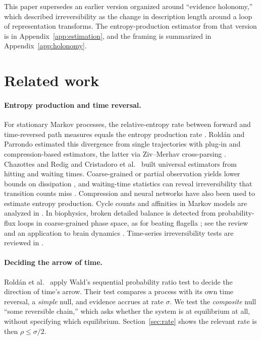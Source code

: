 \documentclass[11pt]{article}
\theoremstyle{definition}
\theoremstyle{remark}
\begin{document}
This paper supersedes an earlier version organized around ``evidence holonomy,'' which described irreversibility as the change in description length around a loop of representation transforms. The entropy-production estimator from that version is in Appendix~\ref{app:estimation}, and the framing is summarized in Appendix~\ref{app:holonomy}.

\section{Related work}\label{sec:related}

\paragraph{Entropy production and time reversal.} For stationary Markov processes, the relative-entropy rate between forward and time-reversed path measures equals the entropy production rate \cite{schnakenberg1976,gaspard2004,seifert2012}. Roldán and Parrondo estimated this divergence from single trajectories with plug-in and compression-based estimators, the latter via Ziv--Merhav cross-parsing \cite{roldanparrondo2010,roldanparrondo2012,zivmerhav1993}. Chazottes and Redig \cite{chazottesredig2005} and Cristadoro et al.\ \cite{cristadoro2023} built universal estimators from hitting and waiting times. Coarse-grained or partial observation yields lower bounds on dissipation \cite{gomezmarin2008}, and waiting-time statistics can reveal irreversibility that transition counts miss \cite{martinez2019}. Compression \cite{martiniani2019,ro2022} and neural networks \cite{kim2020} have also been used to estimate entropy production. Cycle counts and affinities in Markov models are analyzed in \cite{pietzonka2021}. In biophysics, broken detailed balance is detected from probability-flux loops in coarse-grained phase space, as for beating flagella \cite{battle2016}; see the review \cite{gnesotto2018} and an application to brain dynamics \cite{lynn2021}. Time-series irreversibility tests are reviewed in \cite{zaninpapo2021}.

\paragraph{Deciding the arrow of time.} Roldán et al.\ \cite{roldan2015} apply Wald's sequential probability ratio test to decide the direction of time's arrow. Their test compares a process with its own time reversal, a \emph{simple} null, and evidence accrues at rate $\sigma$. We test the \emph{composite} null ``some reversible chain,'' which asks whether the system is at equilibrium at all, without specifying which equilibrium. Section~\ref{sec:rate} shows the relevant rate is then $\rho\le\sigma/2$.
\end{document}
